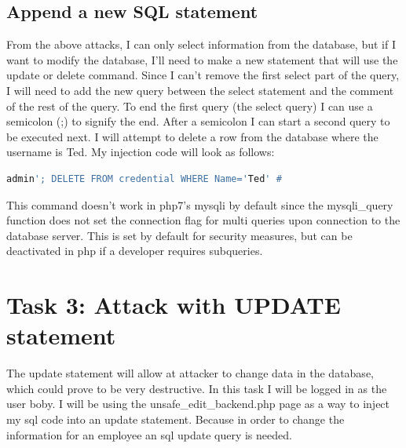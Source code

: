 \documentclass[14pt]{extarticle}
\begin{document}
\subsection{Append a new SQL statement}
From the above attacks, I can only select information from the database, but if I want to modify the database, I'll need to make a new statement that will use the update or delete command. Since I can't remove the first select part of the query, I will need to add the new query between the select statement and the comment of the rest of the query\cite{seed-sqlatk}. To end the first query (the select query) I can use a semicolon (;) to signify the end. After a semicolon I can start a second query to be executed next. I will attempt to delete a row from the database where the username is Ted. My injection code will look as follows:
\begin{lstlisting}[language=sh]
admin'; DELETE FROM credential WHERE Name='Ted' #
\end{lstlisting}
This command doesn't work in php7's mysqli by default since the mysqli\_query function does not set the connection flag for multi queries upon connection to the database server\cite{phpmultiquery}. This is set by default for security measures, but can be deactivated in php if a developer requires subqueries.

\section{Task 3: Attack with UPDATE statement}
The update statement will allow at attacker to change data in the database, which could prove to be very destructive. In this task I will be logged in as the user boby. I will be using the unsafe\_edit\_backend.php page as a way to inject my sql code into an update statement. Because in order to change the information for an employee an sql update query is needed\cite{seed-sqlatk}.
\end{document}
